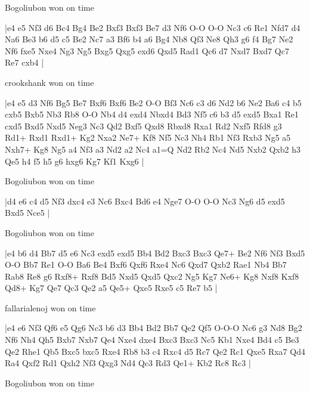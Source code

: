 \showboard

Bogoliubon won on time

\makegametitle
|e4 e5 Nf3 d6 Bc4 Bg4 Be2 Bxf3 Bxf3 Be7 d3 Nf6 O-O O-O Nc3 c6 Re1 Nfd7 d4 Na6 Be3 b6 d5 c5 Be2 Nc7 a3 Bf6 b4 a6 Bg4 Nb8 Qf3 Ne8 Qh3 g6 f4 Bg7 Ne2 Nf6 fxe5 Nxe4 Ng3 Ng5 Bxg5 Qxg5 exd6 Qxd5 Rad1 Qc6 d7 Nxd7 Bxd7 Qc7 Re7 cxb4  |

\showboard

crookshank won on time

\makegametitle
|e4 e5 d3 Nf6 Bg5 Be7 Bxf6 Bxf6 Be2 O-O Bf3 Nc6 c3 d6 Nd2 b6 Ne2 Ba6 c4 b5 cxb5 Bxb5 Nb3 Rb8 O-O Nb4 d4 exd4 Nbxd4 Bd3 Nf5 c6 b3 d5 exd5 Bxa1 Re1 cxd5 Bxd5 Nxd5 Neg3 Nc3 Qd2 Bxf5 Qxd8 Rbxd8 Rxa1 Rd2 Nxf5 Rfd8 g3 Rd1+ Rxd1 Rxd1+ Kg2 Nxa2 Ne7+ Kf8 Nf5 Nc3 Nh4 Rb1 Nf3 Rxb3 Ng5 a5 Nxh7+ Kg8 Ng5 a4 Nf3 a3 Nd2 a2 Nc4 a1=Q Nd2 Rb2 Nc4 Nd5 Nxb2 Qxb2 h3 Qe5 h4 f5 h5 g6 hxg6 Kg7 Kf1 Kxg6  |

\showboard

Bogoliubon won on time

\makegametitle
|d4 e6 c4 d5 Nf3 dxc4 e3 Nc6 Bxc4 Bd6 e4 Nge7 O-O O-O Nc3 Ng6 d5 exd5 Bxd5 Nce5  |

\showboard

Bogoliubon won on time

\makegametitle
|e4 b6 d4 Bb7 d5 e6 Nc3 exd5 exd5 Bb4 Bd2 Bxc3 Bxc3 Qe7+ Be2 Nf6 Nf3 Bxd5 O-O Bb7 Re1 O-O Ba6 Be4 Bxf6 Qxf6 Rxe4 Nc6 Qxd7 Qxb2 Rae1 Nb4 Bb7 Rab8 Re8 g6 Rxf8+ Rxf8 Bd5 Nxd5 Qxd5 Qxc2 Ng5 Kg7 Ne6+ Kg8 Nxf8 Kxf8 Qd8+ Kg7 Qe7 Qc3 Qe2 a5 Qe5+ Qxe5 Rxe5 c5 Re7 b5  |

\showboard

fallarialenoj won on time

\makegametitle
|e4 e6 Nf3 Qf6 e5 Qg6 Nc3 b6 d3 Bb4 Bd2 Bb7 Qe2 Qf5 O-O-O Nc6 g3 Nd8 Bg2 Nf6 Nh4 Qh5 Bxb7 Nxb7 Qe4 Nxe4 dxe4 Bxc3 Bxc3 Nc5 Kb1 Nxe4 Bd4 c5 Be3 Qe2 Rhe1 Qb5 Bxc5 bxc5 Rxe4 Rb8 b3 c4 Rxc4 d5 Rc7 Qe2 Rc1 Qxe5 Rxa7 Qd4 Ra4 Qxf2 Rd1 Qxh2 Nf3 Qxg3 Nd4 Qc3 Rd3 Qe1+ Kb2 Rc8 Rc3  |

\showboard

Bogoliubon won on time

